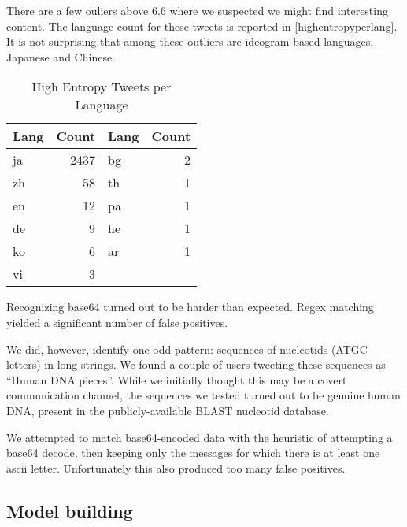 \documentclass[a4paper,11pt]{article}
\begin{document}

There are a few ouliers above 6.6 where we suspected we might find interesting content. The language count for these tweets is reported in \ref{highentropyperlang}. It is not surprising that among these outliers are ideogram-based languages, Japanese and Chinese.

\begin{table}
\centering
\begin{tabular}{|l|r||l|r|}
\hline
Lang & Count & Lang & Count \\
\hline
ja  & 2437 &  bg  &    2 \\
zh  & 58 & th   &   1 \\
en   &   12  & pa  &    1 \\
de   &   9 &   he  &    1 \\
ko    &  6 &  ar   &   1 \\
vi   &   3 & & \\
\hline
\end{tabular}
\caption{High Entropy Tweets per Language}
\end{table}

Recognizing base64 turned out to be harder than expected. Regex matching yielded a significant number of false positives.

We did, however, identify one odd pattern: sequences of nucleotids (ATGC letters) in long strings. We found a couple of users tweeting these sequences as ``Human DNA pieces''. While we initially thought this may be a covert communication channel, the sequences we tested turned out to be genuine human DNA, present in the publicly-available BLAST nucleotid database.



We attempted to match base64-encoded data with the heuristic of attempting a base64 decode, then keeping only the messages for which there is at least one ascii letter. Unfortunately this also produced too many false positives.



\subsection{Model building}
\end{document}
